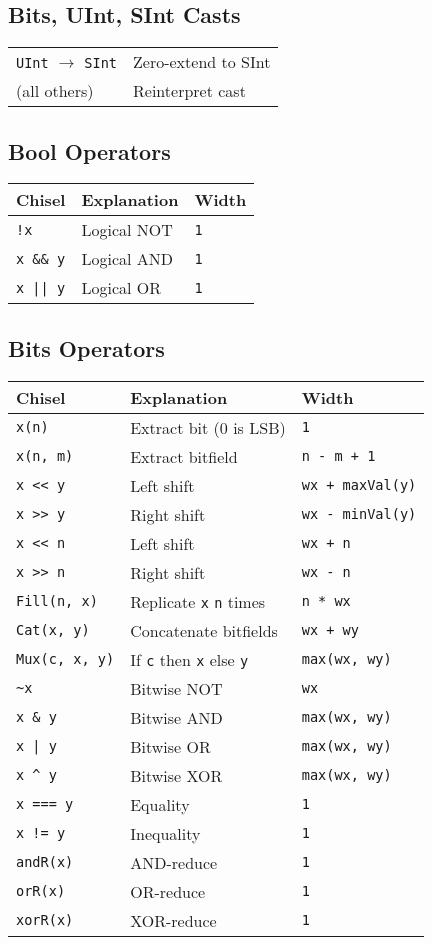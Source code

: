 \documentclass[10pt,landscape]{article}
\begin{document}
\begin{multicols}{3}
\subsection{Bits, UInt, SInt Casts}
\begin{tabular}{l l}
\verb$UInt$ $\rightarrow$ \verb$SInt$ & Zero-extend to SInt \\
(all others) & Reinterpret cast \\
\end{tabular}

\subsection{Bool Operators}
\begin{tabular}{l l l}
Chisel & Explanation & Width \\
\hline
\hline
\verb$!x$ & Logical NOT & \verb$1$ \\
\verb$x && y$ & Logical AND & \verb$1$ \\
\verb$x || y$ & Logical OR & \verb$1$ \\
\end{tabular}

\subsection{Bits Operators}
\begin{tabular}{l l l}
Chisel & Explanation & Width \\
\hline
\hline
\verb$x(n)$ & Extract bit (0 is LSB) & \verb$1$ \\
\verb$x(n, m)$ & Extract bitfield & \verb$n - m + 1$ \\
\verb$x << y$ & Left shift & \verb$wx + maxVal(y)$ \\
\verb$x >> y$ & Right shift & \verb$wx - minVal(y)$ \\
\verb$x << n$ & Left shift & \verb$wx + n$ \\
\verb$x >> n$ & Right shift & \verb$wx - n$ \\
\verb$Fill(n, x)$ & Replicate \verb$x$ \verb$n$ times & \verb$n * wx$ \\
\verb$Cat(x, y)$ & Concatenate bitfields & \verb$wx + wy$ \\
\verb$Mux(c, x, y)$ & If \verb$c$ then \verb$x$ else \verb$y$ & \verb$max(wx, wy)$ \\
\hline
\verb$~x$ & Bitwise NOT & \verb$wx$ \\
\verb$x & y$ & Bitwise AND & \verb$max(wx, wy)$ \\
\verb$x | y$ & Bitwise OR & \verb$max(wx, wy)$ \\
\verb$x ^ y$ & Bitwise XOR & \verb$max(wx, wy)$ \\
\hline
\verb$x === y$ & Equality & \verb$1$ \\
\verb$x != y$ & Inequality & \verb$1$ \\
\hline
\verb$andR(x)$ & AND-reduce & \verb$1$ \\
\verb$orR(x)$ & OR-reduce & \verb$1$ \\
\verb$xorR(x)$ & XOR-reduce & \verb$1$ \\
\end{tabular}


\end{multicols}
\end{document}

